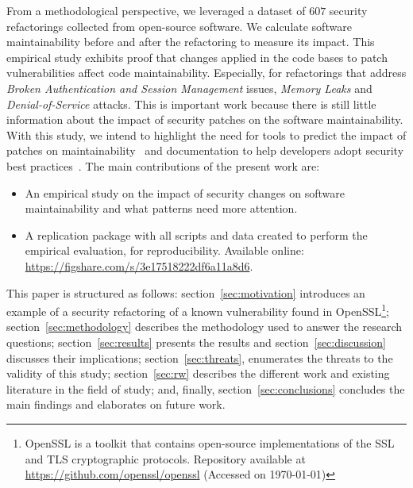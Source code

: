 \documentclass[sigconf,review]{acmart}
\begin{document}
From a methodological 
perspective, we leveraged a dataset of $607$ security refactorings collected from open-source 
software. We calculate software maintainability before and after the refactoring to measure its 
impact. This empirical study exhibits proof that changes 
applied in the code bases to patch vulnerabilities affect code maintainability. 
Especially, for refactorings that address \emph{Broken Authentication and Session Management} 
issues, \emph{Memory Leaks} and \emph{Denial-of-Service} attacks. This is important work
because there is still little information about the impact of security patches on the software
maintainability. With this study, 
we intend to highlight the need for tools to predict the impact of patches on 
maintainability~\cite{4724577} and documentation to help developers adopt security 
best practices~\cite{6311252, 7927935, MESQUIDA201519}.
%
%
The main contributions of the present work are:
%
\begin{itemize}
	\item An empirical study on the impact of security changes on software
	maintainability and what patterns need more attention.
	\item A replication package with all scripts and data created to perform the
	empirical evaluation, for reproducibility. Available online:
  \url{https://figshare.com/s/3e17518222df6a11a8d6}.
\end{itemize}
%
This paper is structured as follows: section~\ref{sec:motivation} introduces an
example of a security refactoring of a known vulnerability found in
OpenSSL\footnote{\label{openssl}OpenSSL is a toolkit that
contains open-source implementations of the SSL and TLS cryptographic
protocols. Repository available at \url{https://github.com/openssl/openssl}
(Accessed on \today{})}; section~\ref{sec:methodology} describes the
methodology used to answer the research questions; section~\ref{sec:results}
presents the results and section~\ref{sec:discussion} discusses their
implications; section~\ref{sec:threats}, enumerates the threats to the validity of
this study; section~\ref{sec:rw} describes the different work and existing
literature in the field of study; and, finally, section~\ref{sec:conclusions}
concludes the main findings and elaborates on future work.
%
\end{document}
